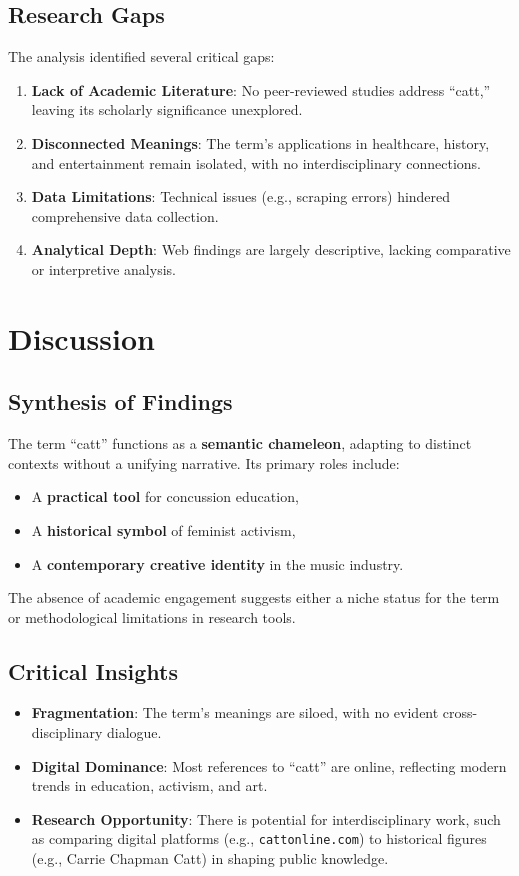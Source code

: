 \documentclass{article}
\begin{document}
\subsection{Research Gaps}
The analysis identified several critical gaps:
\begin{enumerate}
    \item \textbf{Lack of Academic Literature}: No peer-reviewed studies address ``catt,'' leaving its scholarly significance unexplored.
    \item \textbf{Disconnected Meanings}: The term's applications in healthcare, history, and entertainment remain isolated, with no interdisciplinary connections.
    \item \textbf{Data Limitations}: Technical issues (e.g., scraping errors) hindered comprehensive data collection.
    \item \textbf{Analytical Depth}: Web findings are largely descriptive, lacking comparative or interpretive analysis.
\end{enumerate}

\section{Discussion}
\subsection{Synthesis of Findings}
The term ``catt'' functions as a \textbf{semantic chameleon}, adapting to distinct contexts without a unifying narrative. Its primary roles include:
\begin{itemize}
    \item A \textbf{practical tool} for concussion education,
    \item A \textbf{historical symbol} of feminist activism,
    \item A \textbf{contemporary creative identity} in the music industry.
\end{itemize}
The absence of academic engagement suggests either a niche status for the term or methodological limitations in research tools.

\subsection{Critical Insights}
\begin{itemize}
    \item \textbf{Fragmentation}: The term's meanings are siloed, with no evident cross-disciplinary dialogue.
    \item \textbf{Digital Dominance}: Most references to ``catt'' are online, reflecting modern trends in education, activism, and art.
    \item \textbf{Research Opportunity}: There is potential for interdisciplinary work, such as comparing digital platforms (e.g., \texttt{cattonline.com}) to historical figures (e.g., Carrie Chapman Catt) in shaping public knowledge.
\end{itemize}
\end{document}
